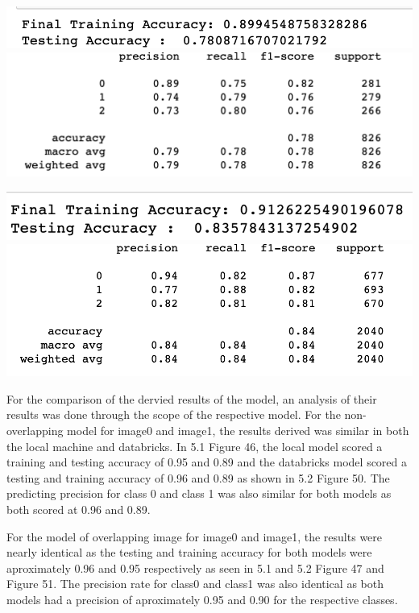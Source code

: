 \documentclass[12pt]{article}
\begin{document}
\begin{multicols*}{2}
\begin{center}
		\includegraphics[scale=0.4]{../screenshot/Rf-Non-Overlapping012/score.png}
    \includegraphics[scale=0.4]{../screenshot/Rf-Non-Overlapping012/machine_score.png}

		\includegraphics[scale=0.4]{../screenshot/Rf-Overlapping012/score.png}
    \includegraphics[scale=0.4]{../screenshot/Rf-Overlapping012/machine_score.png}    
  \end{center}

  \hspace*{5mm} For the comparison of the dervied results of the model, an analysis of their results was done through the scope of the respective model. For the non-overlapping model for image0 and image1, the results
  derived was similar in both the local machine and databricks. In 5.1 Figure 46, the local model scored a training and testing accuracy of 0.95 and 0.89 and the databricks model scored a testing and training accuracy of
  0.96 and 0.89 as shown in 5.2 Figure 50. The predicting precision for class 0 and class 1 was also similar for both models as both scored at 0.96 and 0.89. 

  \hspace*{5mm} For the model of overlapping image for image0 and image1, the results were nearly identical as the testing and training accuracy for both models were aproximately 0.96 and 0.95 respectively as seen in 
  5.1 and 5.2 Figure 47 and Figure 51. The precision rate for class0 and class1 was also identical as both models had a precision of aproximately 0.95 and 0.90 for the respective classes. 



\end{multicols*}
\end{document}
